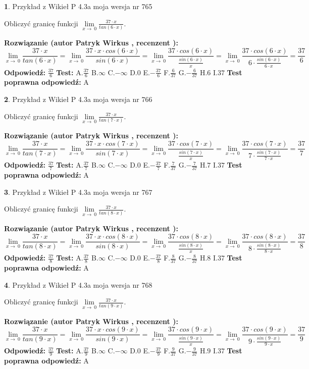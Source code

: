 \documentclass[12pt, a4paper]{article}
\theoremstyle{definition} %
\newtheorem{zad}{}
\newcommand{\zadStart}[1]{\begin{zad}#1\newline}
\newcommand{\zadStop}{\end{zad}}
\newcommand{\rozwStart}[2]{\noindent \textbf{Rozwiązanie (autor #1 , recenzent #2): }\newline}
\newcommand{\rozwStop}{\newline}
\newcommand{\odpStart}{\noindent \textbf{Odpowiedź:}\newline}
\newcommand{\odpStop}{\newline}
\newcommand{\testStart}{\noindent \textbf{Test:}\newline}
\newcommand{\testStop}{\newline}
\newcommand{\kluczStart}{\noindent \textbf{Test poprawna odpowiedź:}\newline}
\newcommand{\kluczStop}{\newline}
\begin{document}
\zadStart{Przykład z Wikieł P 4.3a moja wersja nr 765}


Obliczyć granicę funkcji $\lim\limits_{x\to\ 0}\frac{37 \cdot x}{tan(6 \cdot x)}$.
\zadStop
\rozwStart{Patryk Wirkus}{}
$$\lim\limits_{x\to\ 0}\frac{37 \cdot x}{tan(6 \cdot x)}=\lim\limits_{x\to\ 0}\frac{37 \cdot x \cdot cos(6 \cdot x)}{sin(6 \cdot x)}=\lim\limits_{x\to\ 0}\frac{37 \cdot cos(6 \cdot x)}{\frac{sin(6 \cdot x)}{x}}=\lim\limits_{x\to\ 0}\frac{37 \cdot cos(6 \cdot x)}{6 \cdot \frac{sin(6 \cdot x)}{6 \cdot x}} = \frac{37}{6}$$
\rozwStop
\odpStart
$\frac{37}{6}$
\odpStop
\testStart
A.$\frac{37}{6}$
B.$\infty$
C.$-\infty$
D.$0$
E.$-\frac{37}{6}$
F.$\frac{6}{37}$
G.$-\frac{6}{37}$
H.$6$
I.$37$
\testStop
\kluczStart
A
\kluczStop



\zadStart{Przykład z Wikieł P 4.3a moja wersja nr 766}


Obliczyć granicę funkcji $\lim\limits_{x\to\ 0}\frac{37 \cdot x}{tan(7 \cdot x)}$.
\zadStop
\rozwStart{Patryk Wirkus}{}
$$\lim\limits_{x\to\ 0}\frac{37 \cdot x}{tan(7 \cdot x)}=\lim\limits_{x\to\ 0}\frac{37 \cdot x \cdot cos(7 \cdot x)}{sin(7 \cdot x)}=\lim\limits_{x\to\ 0}\frac{37 \cdot cos(7 \cdot x)}{\frac{sin(7 \cdot x)}{x}}=\lim\limits_{x\to\ 0}\frac{37 \cdot cos(7 \cdot x)}{7 \cdot \frac{sin(7 \cdot x)}{7 \cdot x}} = \frac{37}{7}$$
\rozwStop
\odpStart
$\frac{37}{7}$
\odpStop
\testStart
A.$\frac{37}{7}$
B.$\infty$
C.$-\infty$
D.$0$
E.$-\frac{37}{7}$
F.$\frac{7}{37}$
G.$-\frac{7}{37}$
H.$7$
I.$37$
\testStop
\kluczStart
A
\kluczStop



\zadStart{Przykład z Wikieł P 4.3a moja wersja nr 767}


Obliczyć granicę funkcji $\lim\limits_{x\to\ 0}\frac{37 \cdot x}{tan(8 \cdot x)}$.
\zadStop
\rozwStart{Patryk Wirkus}{}
$$\lim\limits_{x\to\ 0}\frac{37 \cdot x}{tan(8 \cdot x)}=\lim\limits_{x\to\ 0}\frac{37 \cdot x \cdot cos(8 \cdot x)}{sin(8 \cdot x)}=\lim\limits_{x\to\ 0}\frac{37 \cdot cos(8 \cdot x)}{\frac{sin(8 \cdot x)}{x}}=\lim\limits_{x\to\ 0}\frac{37 \cdot cos(8 \cdot x)}{8 \cdot \frac{sin(8 \cdot x)}{8 \cdot x}} = \frac{37}{8}$$
\rozwStop
\odpStart
$\frac{37}{8}$
\odpStop
\testStart
A.$\frac{37}{8}$
B.$\infty$
C.$-\infty$
D.$0$
E.$-\frac{37}{8}$
F.$\frac{8}{37}$
G.$-\frac{8}{37}$
H.$8$
I.$37$
\testStop
\kluczStart
A
\kluczStop



\zadStart{Przykład z Wikieł P 4.3a moja wersja nr 768}


Obliczyć granicę funkcji $\lim\limits_{x\to\ 0}\frac{37 \cdot x}{tan(9 \cdot x)}$.
\zadStop
\rozwStart{Patryk Wirkus}{}
$$\lim\limits_{x\to\ 0}\frac{37 \cdot x}{tan(9 \cdot x)}=\lim\limits_{x\to\ 0}\frac{37 \cdot x \cdot cos(9 \cdot x)}{sin(9 \cdot x)}=\lim\limits_{x\to\ 0}\frac{37 \cdot cos(9 \cdot x)}{\frac{sin(9 \cdot x)}{x}}=\lim\limits_{x\to\ 0}\frac{37 \cdot cos(9 \cdot x)}{9 \cdot \frac{sin(9 \cdot x)}{9 \cdot x}} = \frac{37}{9}$$
\rozwStop
\odpStart
$\frac{37}{9}$
\odpStop
\testStart
A.$\frac{37}{9}$
B.$\infty$
C.$-\infty$
D.$0$
E.$-\frac{37}{9}$
F.$\frac{9}{37}$
G.$-\frac{9}{37}$
H.$9$
I.$37$
\testStop
\kluczStart
A
\kluczStop
\end{document}
